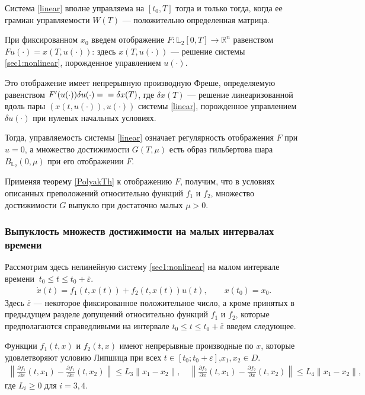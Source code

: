 \documentclass[../main.tex]{subfiles}
\begin{document}
	Система \eqref{linear} вполне управляема на  $ [t_0, T] $ тогда и только тогда, когда ее грамиан управляемости $W(T)$ --- положительно определенная матрица.
	
	При фиксированном $x_0$ введем отображение $F: \mathbb{L}_2[0,T] \rightarrow \mathbb{R}^n $ равенством $Fu(\cdot) = x(T,u(\cdot))$: здесь $ x(T,u(\cdot))$ --- решение системы \eqref{sec1:nonlinear}, порожденное управлением $u(\cdot)$. 
	
	Это отображение имеет непрерывную производную Фреше, определяемую равенством $ F'(u(\cdot))\delta u(\cdot) = \\=\delta x(T)$, где $\delta x(T)$ --- решение линеаризованной вдоль пары $\left( x(t,u(\cdot)),u(\cdot)\right)  $ системы \eqref{linear}, порожденное управлением $\delta u(\cdot)$ при нулевых начальных условиях.
	
	 Тогда, управляемость системы \eqref{linear} означает регулярность отображения $F$ при $u = 0$, а множество достижимости $G(T,\mu)$ есть образ гильбертова шара $B_{\mathbb{L}_2}(0,\mu)$ при его отображении $F$.
	
	Применяя теорему \ref{PolyakTh} к отображению $F$, получим, что в условиях описанных преположений относительно функций $f_1$ и $f_2$, множество достижимости $G$ выпукло при достаточно малых $\mu > 0$.
	
    \subsubsection{Выпуклость множеств достижимости на малых интервалах времени}
    Рассмотрим здесь нелинейную систему \eqref{sec1:nonlinear} на малом интервале времени $\ t_0 \leqslant t \leqslant t_0 + \overline{\varepsilon} $.
    \begin{gather}\label{nonlinearT}
			\dot{x}(t)=f_1(t,x(t))+f_2(t,x(t))u(t), \qquad x(t_0) = x_0.
	\end{gather}
    Здесь $ \overline{\varepsilon} $ --- некоторое фиксированное положительное число, а кроме принятых в предыдущем разделе допущений относительно функций $f_1$ и $f_2$, которые предполагаются справедливыми на интервале $t_0 \leqslant t \leqslant t_0 + \overline{\varepsilon} $ введем следующее.
    \begin{assumption}\label{Pred}
    	Функции $f_1(t,x)$ и $f_2(t,x)$ имеют непрерывные производные по $x$, которые удовлетворяют условию Липшица при всех $t \in [t_0;t_0+\varepsilon]$,$x_1, x_2 \in D$.
    	\begin{gather*}
    			\left\| \frac{\partial f_1}{\partial x}(t,x_1) - \frac{\partial f_1}{\partial x}(t,x_2) \right\| \leqslant L_3 \| x_1 - x_2\|, \quad 	\left\| \frac{\partial f_2}{\partial x}(t,x_1) - \frac{\partial f_2}{\partial x}(t,x_2) \right\| \leqslant L_4 \| x_1 - x_2\|,
    	\end{gather*}
    	где $L_i \geqslant 0$ для $i = 3,4$.
    \end{assumption}
\end{document}
